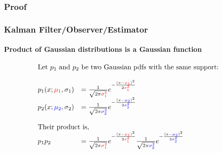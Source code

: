 \subsubsection{Proof}
\begin{frame}\pw\Large
\frametitle{Kalman Filter/Observer/Estimator}
\framesubtitle{Product of Gaussian distributions is a Gaussian function}


\scriptsize
\begin{equation*}
\begin{array}{llll}
\multicolumn{2}{l}{\textrm{Let $p_1$ and $p_2$ be two Gaussian pdfs with the same support:}}\\\\
p_1(x; \muone, \sone)&=\frac{1}{\sqrt{2 \pi \varone}} e^{-\frac{(x-\muone)^2}{2 \varone}}\\
p_2(x; \mutwo, \stwo)&=\frac{1}{\sqrt{2 \pi \vartwo}} e^{-\frac{(x-\mutwo)^2}{2 \vartwo}}\\\\

\multicolumn{2}{l}{\textrm{Their product is,}}\\
p_1p_2 &=     \frac{1}{\sqrt{2 \pi \varone}} e^{-\frac{(x-\muone)^2}{2 \varone}}    \frac{1}{\sqrt{2 \pi \vartwo}} e^{-\frac{(x-\mutwo)^2}{2 \vartwo}}\\\\
\end{array}
\end{equation*}
%
\end{frame}




